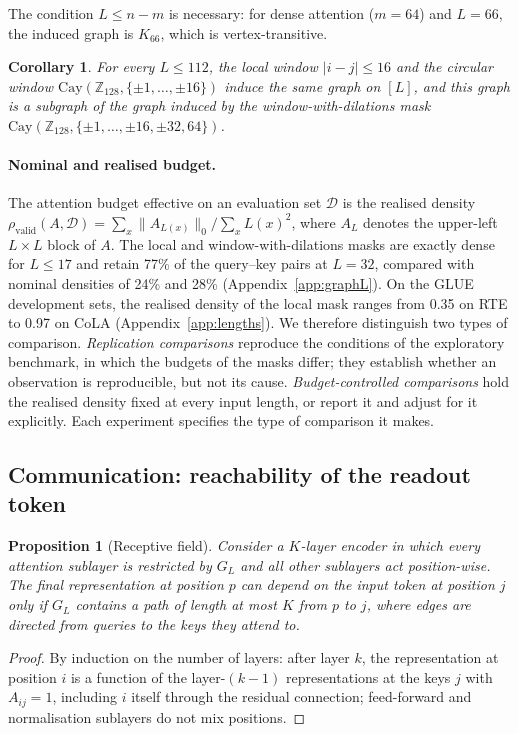 \documentclass[10pt]{article}
\newtheorem{proposition}{Proposition}
\newtheorem{corollary}{Corollary}
\newcommand{\Z}{\mathbb{Z}}
\newcommand{\Cay}{\mathrm{Cay}}
\begin{document}
The condition $L\le n-m$ is necessary: for dense attention ($m=64$) and $L=66$, the induced graph is $K_{66}$, which is vertex-transitive.

\begin{corollary}
\label{cor:local}
For every $L\le 112$, the local window $|i-j|\le16$ and the circular window $\Cay(\Z_{128},\{\pm1,\dots,\pm16\})$ induce the same graph on $[L]$, and this graph is a subgraph of the graph induced by the window-with-dilations mask $\Cay(\Z_{128},\{\pm1,\dots,\pm16,\pm32,64\})$.
\end{corollary}

\paragraph{Nominal and realised budget.}
\label{sec:realised}
The attention budget effective on an evaluation set $\mathcal D$ is the realised density $\rho_{\mathrm{valid}}(A,\mathcal D)=\sum_{x}\lVert A_{L(x)}\rVert_0/\sum_xL(x)^2$, where $A_L$ denotes the upper-left $L\times L$ block of $A$. The local and window-with-dilations masks are exactly dense for $L\le17$ and retain 77\% of the query--key pairs at $L=32$, compared with nominal densities of 24\% and 28\% (Appendix~\ref{app:graphL}). On the GLUE development sets, the realised density of the local mask ranges from 0.35 on RTE to 0.97 on CoLA (Appendix~\ref{app:lengths}). We therefore distinguish two types of comparison. \emph{Replication comparisons} reproduce the conditions of the exploratory benchmark, in which the budgets of the masks differ; they establish whether an observation is reproducible, but not its cause. \emph{Budget-controlled comparisons} hold the realised density fixed at every input length, or report it and adjust for it explicitly. Each experiment specifies the type of comparison it makes.

\subsection{Communication: reachability of the readout token}
\label{sec:comm}

\begin{proposition}[Receptive field]
\label{prop:reach}
Consider a $K$-layer encoder in which every attention sublayer is restricted by $G_L$ and all other sublayers act position-wise. The final representation at position $p$ can depend on the input token at position $j$ only if $G_L$ contains a path of length at most $K$ from $p$ to $j$, where edges are directed from queries to the keys they attend to.
\end{proposition}
\begin{proof}
By induction on the number of layers: after layer $k$, the representation at position $i$ is a function of the layer-$(k-1)$ representations at the keys $j$ with $A_{ij}=1$, including $i$ itself through the residual connection; feed-forward and normalisation sublayers do not mix positions.
\end{proof}
\end{document}
